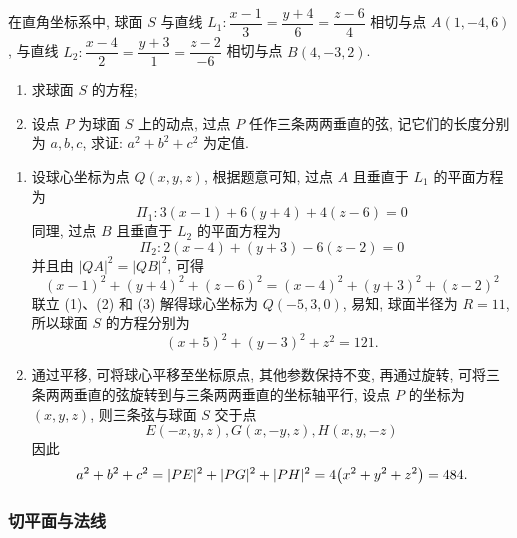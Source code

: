 \begin{example}
    在直角坐标系中, 球面 $S$ 与直线 $L_1:\dfrac{x-1}{3}=\dfrac{y+4}{6}=\dfrac{z-6}{4}$ 相切与点 $A(1,-4,6)$, 与直线 $L_2:\dfrac{x-4}{2}=\dfrac{y+3}{1}=\dfrac{z-2}{-6}$ 相切与点 $B(4,-3,2)$.
    \begin{enumerate}[label=(\arabic{*})]
        \item 求球面 $S$ 的方程;
        \item 设点 $P$ 为球面 $S$ 上的动点, 过点 $P$ 任作三条两两垂直的弦, 记它们的长度分别为 $a,b,c$, 求证: $a^2+b^2+c^2$ 为定值.
    \end{enumerate}
\end{example}
\begin{solution}
    \begin{enumerate}[label=(\arabic{*})]
        \item 设球心坐标为点 $Q(x,y,z)$, 根据题意可知, 过点 $A$ 且垂直于 $L_1$ 的平面方程为
              \begin{equation*}
                  \Pi_1:3(x-1)+6(y+4)+4(z-6)=0
                  \tag*{(1)}
              \end{equation*}
              同理, 过点 $B$ 且垂直于 $L_2$ 的平面方程为
              \begin{equation*}
                  \Pi_2:2(x-4)+(y+3)-6(z-2)=0
                  \tag*{(2)}
              \end{equation*}
              并且由 $|QA|^2=|QB|^2$, 可得
              \begin{equation*}
                  (x-1)^2+(y+4)^2+(z-6)^2=(x-4)^2+(y+3)^2+(z-2)^2
                  \tag*{(3)}
              \end{equation*}
              联立 (1)、(2) 和 (3) 解得球心坐标为 $Q(-5,3,0)$, 易知, 球面半径为 $R=11$, 所以球面 $S$ 的方程分别为
              $$(x+5)^2+(y-3)^2+z^2=121.$$
        \item 通过平移, 可将球心平移至坐标原点, 其他参数保持不变, 再通过旋转, 可将三条两两垂直的弦旋转到与三条两两垂直的坐标轴平行,
              设点 $P$ 的坐标为 $(x,y,z)$, 则三条弦与球面 $S$ 交于点 $$E(-x,y,z),G(x,-y,z),H(x,y,-z)$$
              因此 $$a^2+b^2+c^2=|PE|^2+|PG|^2+|PH|^2=4\qty(x^2+y^2+z^2)=484.$$
    \end{enumerate}
\end{solution}

\subsubsection{切平面与法线}


